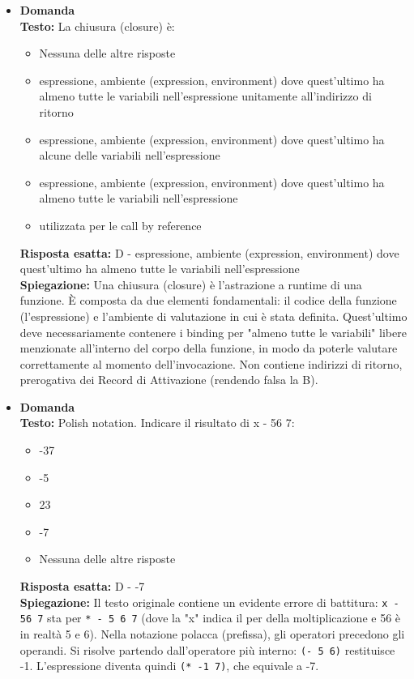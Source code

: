 \documentclass[12pt, a4paper]{article}
\newcounter{domandateoria}
\begin{document}
\begin{itemize}
    \item {}\textbf{Domanda \thedomandateoria} \\
    \textbf{Testo:} La chiusura (closure) è:
    \begin{itemize}
        \item[A)] Nessuna delle altre risposte
        \item[B)] espressione, ambiente (expression, environment) dove quest'ultimo ha almeno tutte le variabili nell'espressione unitamente all'indirizzo di ritorno
        \item[C)] espressione, ambiente (expression, environment) dove quest'ultimo ha alcune delle variabili nell'espressione
        \item[D)] espressione, ambiente (expression, environment) dove quest'ultimo ha almeno tutte le variabili nell'espressione
        \item[E)] utilizzata per le call by reference
    \end{itemize}
    \textbf{Risposta esatta:} D - espressione, ambiente (expression, environment) dove quest'ultimo ha almeno tutte le variabili nell'espressione \\
    \textbf{Spiegazione:} Una chiusura (closure) è l'astrazione a runtime di una funzione. È composta da due elementi fondamentali: il codice della funzione (l'espressione) e l'ambiente di valutazione in cui è stata definita. Quest'ultimo deve necessariamente contenere i binding per "almeno tutte le variabili" libere menzionate all'interno del corpo della funzione, in modo da poterle valutare correttamente al momento dell'invocazione. Non contiene indirizzi di ritorno, prerogativa dei Record di Attivazione (rendendo falsa la B).
    \vspace{0.3cm}

    \item {}\textbf{Domanda \thedomandateoria} \\
    \textbf{Testo:} Polish notation. Indicare il risultato di x - 56 7:
    \begin{itemize}
        \item[A)] -37
        \item[B)] -5
        \item[C)] 23
        \item[D)] -7
        \item[E)] Nessuna delle altre risposte
    \end{itemize}
    \textbf{Risposta esatta:} D - -7 \\
    \textbf{Spiegazione:} Il testo originale contiene un evidente errore di battitura: \texttt{x - 56 7} sta per \texttt{* - 5 6 7} (dove la "x" indica il per della moltiplicazione e 56 è in realtà 5 e 6). Nella notazione polacca (prefissa), gli operatori precedono gli operandi. Si risolve partendo dall'operatore più interno: \texttt{(- 5 6)} restituisce -1. L'espressione diventa quindi \texttt{(* -1 7)}, che equivale a -7.
    \vspace{0.3cm}


\end{itemize}
\end{document}
